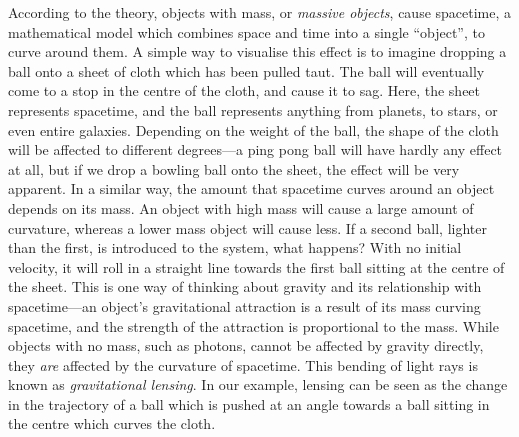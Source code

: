 \documentclass[a4paper,11pt]{article}
\begin{document}
   According to the theory, objects with mass, or \emph{massive objects}, cause
   spacetime, a mathematical model which combines space and time into a single
   ``object'', to curve around them. A simple way to visualise this effect is to
   imagine dropping a ball onto a sheet of cloth which has been pulled taut. The
   ball will eventually come to a stop in the centre of the cloth, and cause it
   to sag. Here, the sheet represents spacetime, and the ball represents
   anything from planets, to stars, or even entire galaxies. Depending on the
   weight of the ball, the shape of the cloth will be affected to different
   degrees---a ping pong ball will have hardly any effect at all, but if we drop
   a bowling ball onto the sheet, the effect will be very apparent. In a similar
   way, the amount that spacetime curves around an object depends on its
   mass. An object with high mass will cause a large amount of curvature,
   whereas a lower mass object will cause less. If a second ball, lighter than
   the first, is introduced to the system, what happens?  With no initial
   velocity, it will roll in a straight line towards the first ball sitting at
   the centre of the sheet. This is one way of thinking about gravity and its
   relationship with spacetime---an object's gravitational attraction is a
   result of its mass curving spacetime, and the strength of the attraction is
   proportional to the mass. While objects with no mass, such as photons, cannot
   be affected by gravity directly, they \emph{are} affected by the curvature of
   spacetime. This bending of light rays is known as \emph{gravitational
   lensing}. In our example, lensing can be seen as the change in the trajectory
   of a ball which is pushed at an angle towards a ball sitting in the centre
   which curves the cloth.
\end{document}
